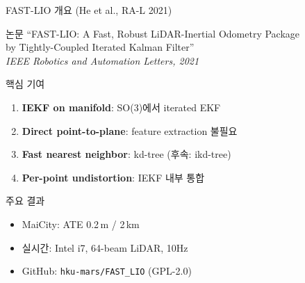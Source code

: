 \begin{frame}{FAST-LIO 개요 (He et al., RA-L 2021)}
  \begin{block}{논문}
    ``FAST-LIO: A Fast, Robust LiDAR-Inertial Odometry Package\\
    by Tightly-Coupled Iterated Kalman Filter''\\
    \textit{IEEE Robotics and Automation Letters, 2021}
  \end{block}
  \pause
  \begin{block}{핵심 기여}
    \begin{enumerate}
      \item \textbf{IEKF on manifold}: SO(3)에서 iterated EKF
      \item \textbf{Direct point-to-plane}: feature extraction 불필요
      \item \textbf{Fast nearest neighbor}: kd-tree (후속: ikd-tree)
      \item \textbf{Per-point undistortion}: IEKF 내부 통합
    \end{enumerate}
  \end{block}
  \pause
  \begin{exampleblock}{주요 결과}
    \begin{itemize}
      \item MaiCity: ATE 0.2\,m / 2\,km
      \item 실시간: Intel i7, 64-beam LiDAR, 10Hz
      \item GitHub: \texttt{hku-mars/FAST\_LIO} (GPL-2.0)
    \end{itemize}
  \end{exampleblock}
\end{frame}

